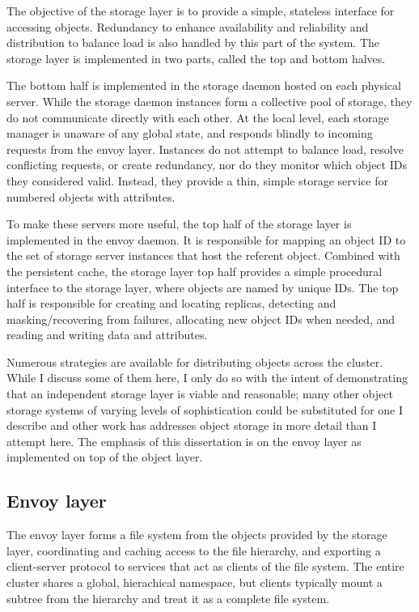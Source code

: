 The objective of the storage layer is to provide a simple, stateless interface for accessing objects. Redundancy to enhance availability and reliability and distribution to balance load is also handled by this part of the system. The storage layer is implemented in two parts, called the top and bottom halves.

The bottom half is implemented in the storage daemon hosted on each physical server. While the storage daemon instances form a collective pool of storage, they do not communicate directly with each other. At the local level, each storage manager is unaware of any global state, and responds blindly to incoming requests from the envoy layer. Instances do not attempt to balance load, resolve conflicting requests, or create redundancy, nor do they monitor which object IDs they considered valid. Instead, they provide a thin, simple storage service for numbered objects with attributes.

To make these servers more useful, the top half of the storage layer is implemented in the envoy daemon. It is responsible for mapping an object ID to the set of storage server instances that host the referent object. Combined with the persistent cache, the storage layer top half provides a simple procedural interface to the storage layer, where objects are named by unique IDs. The top half is responsible for creating and locating replicas, detecting and masking/recovering from failures, allocating new object IDs when needed, and reading and writing data and attributes.

Numerous strategies are available for distributing objects across the cluster. While I discuss some of them here, I only do so with the intent of demonstrating that an independent storage layer is viable and reasonable; many other object storage systems of varying levels of sophistication could be substituted for one I describe and other work has addresses object storage in more detail than I attempt here. The emphasis of this dissertation is on the envoy layer as implemented on top of the object layer.

\subsection{Envoy layer}

The envoy layer forms a file system from the objects provided by the storage layer, coordinating and caching access to the file hierarchy, and exporting a client-server protocol to services that act as clients of the file system. The entire cluster shares a global, hierachical namespace, but clients typically mount a subtree from the hierarchy and treat it as a complete file system.

